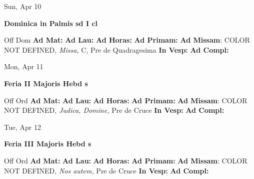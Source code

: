 \documentclass[10pt]{memoir}
\begin{document}
\begin{center}
\begin{minipage}{3.5in}
\vspace{2em}
\begin{center}Sun, Apr 10
\end{center}
\textbf{ \large Dominica in Palmis
\textnormal{\normalsize sd I cl}}

\begin{justify}Off Dom
\textbf{Ad Mat: }
\textbf{Ad Lau: }
\textbf{Ad Horas: }
\textbf{Ad Primam: }\textbf{Ad Missam}: COLOR NOT DEFINED, \textit{Missa,} C, Pre de Quadragesima
\textbf{In Vesp: }
\textbf{Ad Compl: }
\end{justify}
\end{minipage}
\end{center}

\begin{center}
\begin{minipage}{3.5in}
\vspace{2em}
\begin{center}Mon, Apr 11
\end{center}
\textbf{ \large Feria II Majoris Hebd
\textnormal{\normalsize s}}

\begin{justify}Off Ord
\textbf{Ad Mat: }
\textbf{Ad Lau: }
\textbf{Ad Horas: }
\textbf{Ad Primam: }\textbf{Ad Missam}: COLOR NOT DEFINED, \textit{Judica, Domine,} Pre de Cruce
\textbf{In Vesp: }
\textbf{Ad Compl: }
\end{justify}
\end{minipage}
\end{center}

\begin{center}
\begin{minipage}{3.5in}
\vspace{2em}
\begin{center}Tue, Apr 12
\end{center}
\textbf{ \large Feria III Majoris Hebd
\textnormal{\normalsize s}}

\begin{justify}Off Ord
\textbf{Ad Mat: }
\textbf{Ad Lau: }
\textbf{Ad Horas: }
\textbf{Ad Primam: }\textbf{Ad Missam}: COLOR NOT DEFINED, \textit{Nos autem,} Pre de Cruce
\textbf{In Vesp: }
\textbf{Ad Compl: }
\end{justify}
\end{minipage}
\end{center}
\end{document}
